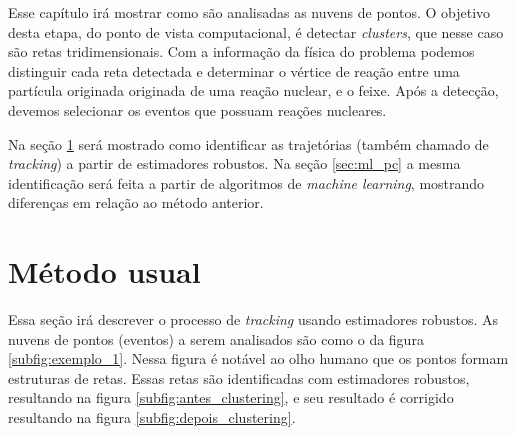 \documentclass[a4paper,12pt,oneside]{book}
\begin{document}
\par Esse capítulo irá mostrar como são analisadas as nuvens de pontos. O objetivo desta etapa, do ponto de vista computacional, é detectar \textit{clusters}, que nesse caso são retas tridimensionais. Com a informação da física do problema podemos distinguir cada reta detectada e determinar o vértice de reação entre uma partícula originada originada de uma reação nuclear, e o feixe. Após a detecção, devemos selecionar os eventos que possuam reações nucleares.

\par Na seção \ref{sec:forcabruta} será mostrado como identificar as trajetórias (também chamado de \textit{tracking}) a partir de estimadores robustos. Na seção \ref{sec:ml_pc} a mesma identificação será feita a partir de algoritmos de \textit{machine learning}, mostrando diferenças em relação ao método anterior.


\section{Método usual}\label{sec:forcabruta}

\par Essa seção irá descrever o processo de \textit{tracking} usando estimadores robustos. As nuvens de pontos (eventos) a serem analisados são como o da figura \ref{subfig:exemplo_1}. Nessa figura é notável ao olho humano que os pontos formam estruturas de retas. Essas retas são identificadas com estimadores robustos\cite{artigo}, resultando na figura \ref{subfig:antes_clustering}, e seu resultado é corrigido resultando na figura \ref{subfig:depois_clustering}. 
\end{document}
